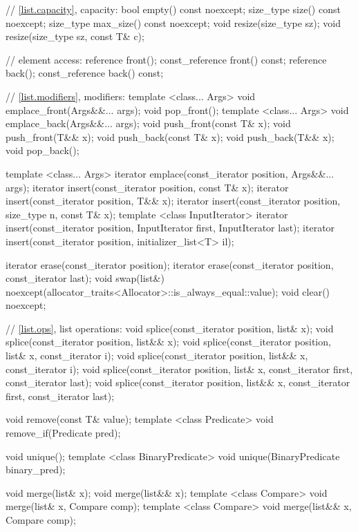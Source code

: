\begin{codeblock}
{{    // \ref{list.capacity}, capacity:
    bool      empty() const noexcept;
    size_type size() const noexcept;
    size_type max_size() const noexcept;
    void      resize(size_type sz);
    void      resize(size_type sz, const T& c);

    // element access:
    reference       front();
    const_reference front() const;
    reference       back();
    const_reference back() const;

    // \ref{list.modifiers}, modifiers:
    template <class... Args> void emplace_front(Args&&... args);
    void pop_front();
    template <class... Args> void emplace_back(Args&&... args);
    void push_front(const T& x);
    void push_front(T&& x);
    void push_back(const T& x);
    void push_back(T&& x);
    void pop_back();

    template <class... Args> iterator emplace(const_iterator position, Args&&... args);
    iterator insert(const_iterator position, const T& x);
    iterator insert(const_iterator position, T&& x);
    iterator insert(const_iterator position, size_type n, const T& x);
    template <class InputIterator>
      iterator insert(const_iterator position, InputIterator first,
                      InputIterator last);
    iterator insert(const_iterator position, initializer_list<T> il);

    iterator erase(const_iterator position);
    iterator erase(const_iterator position, const_iterator last);
    void     swap(list&)
      noexcept(allocator_traits<Allocator>::is_always_equal::value);
    void     clear() noexcept;

    // \ref{list.ops}, list operations:
    void splice(const_iterator position, list& x);
    void splice(const_iterator position, list&& x);
    void splice(const_iterator position, list& x, const_iterator i);
    void splice(const_iterator position, list&& x, const_iterator i);
    void splice(const_iterator position, list& x,
                const_iterator first, const_iterator last);
    void splice(const_iterator position, list&& x,
                const_iterator first, const_iterator last);

    void remove(const T& value);
    template <class Predicate> void remove_if(Predicate pred);

    void unique();
    template <class BinaryPredicate>
      void unique(BinaryPredicate binary_pred);

    void merge(list& x);
    void merge(list&& x);
    template <class Compare> void merge(list& x, Compare comp);
    template <class Compare> void merge(list&& x, Compare comp);

}}
\end{codeblock}
